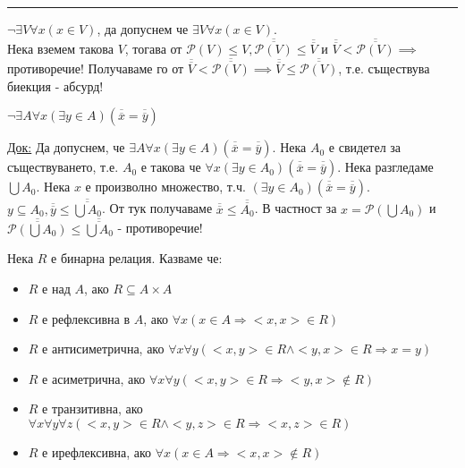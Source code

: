\documentclass[fleqn, titlepage, 12pt]{report}
\begin{document}
\bigbreak
\hrule
\bigbreak

$\lnot \exists{V}\forall{x}(x \in V)$, да допуснем че $\exists{V}\forall{x}(x \in V)$.\\
Нека вземем такова $V$,
тогава от $\mathcal{P}(V) \leq V, \overline{\overline{\mathcal{P}(V)}} \leq \overline{\overline{V}}$ и
$\overline{\overline{V}} < \overline{\overline{\mathcal{P}(V)}} \implies$ противоречие!
Получаваме го от $\overline{\overline{V}} < \overline{\overline{\mathcal{P}(V)}}
\implies \overline{\overline{V}} \leq \overline{\overline{\mathcal{P}(V)}}$, т.е. съществува биекция - абсурд!
\bigbreak

 $\lnot \exists{A}\forall{x}(\exists{y \in A})(\overline{\overline{x}} = \overline{\overline{y}})$
\bigbreak

\underline{Док:} Да допуснем, че
$\exists{A}\forall{x}(\exists{y \in A})(\overline{\overline{x}} = \overline{\overline{y}})$.
Нека $A_0$ е свидетел за съществуването, т.е. $A_0$ е такова че
$\forall{x}(\exists{y \in A_0})(\overline{\overline{x}} = \overline{\overline{y}})$. Нека разгледаме $\bigcup A_0$.
Нека $x$ е произволно множество, т.ч. $(\exists{y \in A_0})(\overline{\overline{x}} = \overline{\overline{y}})$.
$y \subseteq A_0, \overline{\overline{y}} \leq \overline{\overline{\bigcup A_0}}$. От тук получаваме
$\overline{\overline{x}} \leq \overline{\overline{A_0}}$. В частност за $x = \mathcal{P}(\bigcup A_0)$ и
$\overline{\overline{\mathcal{P}(\bigcup A_0)}} \leq \overline{\overline{\bigcup A_0}}$ - противоречие!

\clearpage
\begin{center}
\end{center}
\bigbreak

 Нека $R$ е бинарна релация. Казваме че:
\begin{itemize}
  \item $R$ е над $A$, ако $R \subseteq A \times A$
  \item $R$ е рефлексивна в $A$, ако $\forall{x}(x \in A \Rightarrow <x,x> \in R)$
  \item $R$ е антисиметрична, ако $\forall{x}\forall{y}(<x,y> \in R \land <y,x> \in R \Rightarrow x = y)$
  \item $R$ е асиметрична, ако $\forall{x}\forall{y}(<x,y> \in R \Rightarrow <y,x> \notin R)$
  \item $R$ е транзитивна, ако $\forall{x}\forall{y}\forall{z}(<x,y> \in R \land <y,z> \in R \Rightarrow <x,z> \in R)$
  \item $R$ е ирефлексивна, ако $\forall{x}(x \in A \Rightarrow <x,x> \notin R)$
\end{itemize}
\bigbreak
\end{document}
